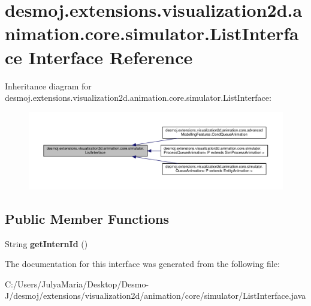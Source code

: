\section{desmoj.\-extensions.\-visualization2d.\-animation.\-core.\-simulator.\-List\-Interface Interface Reference}
\label{interfacedesmoj_1_1extensions_1_1visualization2d_1_1animation_1_1core_1_1simulator_1_1_list_interface}


Inheritance diagram for desmoj.\-extensions.\-visualization2d.\-animation.\-core.\-simulator.\-List\-Interface\-:
\nopagebreak
\begin{figure}[H]
\begin{center}
\leavevmode
\includegraphics[width=350pt]{interfacedesmoj_1_1extensions_1_1visualization2d_1_1animation_1_1core_1_1simulator_1_1_list_interface__inherit__graph}
\end{center}
\end{figure}
\subsection*{Public Member Functions}
\begin{DoxyCompactItemize}
\item 
String {\bfseries get\-Intern\-Id} ()\label{interfacedesmoj_1_1extensions_1_1visualization2d_1_1animation_1_1core_1_1simulator_1_1_list_interface_a306fe273d60914b523280bf3b5bfbcb4}

\end{DoxyCompactItemize}


The documentation for this interface was generated from the following file\-:\begin{DoxyCompactItemize}
\item 
C\-:/\-Users/\-Julya\-Maria/\-Desktop/\-Desmo-\/\-J/desmoj/extensions/visualization2d/animation/core/simulator/List\-Interface.\-java\end{DoxyCompactItemize}
